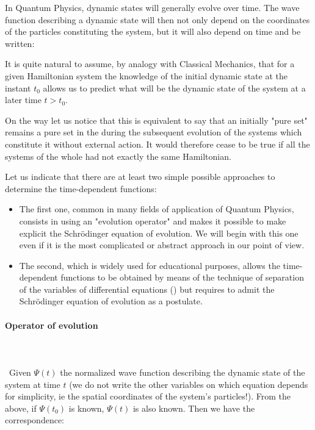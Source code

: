 	In Quantum Physics, dynamic states will generally evolve over time. The wave function describing a dynamic state will then not only depend on the coordinates of the particles constituting the system, but it will also depend on time and be written:
	
	It is quite natural to assume, by analogy with Classical Mechanics, that for a given Hamiltonian system the knowledge of the initial dynamic state at the instant $t_0$ allows us to predict what will be the dynamic state of the system at a later time $t>t_0$.
	
	On the way let us notice that this is equivalent to say that an initially "pure set" remains a pure set in the during the subsequent evolution of the systems which constitute it without external action. It would therefore cease to be true if all the systems of the whole had not exactly the same Hamiltonian.
	
	Let us indicate that there are at least two simple possible approaches to determine the time-dependent functions:
	\begin{itemize}
		\item The first one, common in many fields of application of Quantum Physics, consists in using an "evolution operator" and makes it possible to make explicit the Schrödinger equation of evolution. We will begin with this one even if it is the most complicated or abstract approach in our point of view.

		\item The second, which is widely used for educational purposes, allows the time-dependent functions to be obtained by means of the technique of separation of the variables of differential equations () but requires to admit the Schrödinger equation of evolution as a postulate.
	\end{itemize}
	
	\paragraph{Operator of evolution}\mbox{}\\\\\
	Given $\Psi(t)$ the normalized wave function describing the dynamic state of the system at time $t$ (we do not write the other variables on which equation depends for simplicity, ie the spatial coordinates of the system's particles!). From the above, if $\Psi(t_0)$ is known, $\Psi(t)$ is also known. Then we have the correspondence:
	

